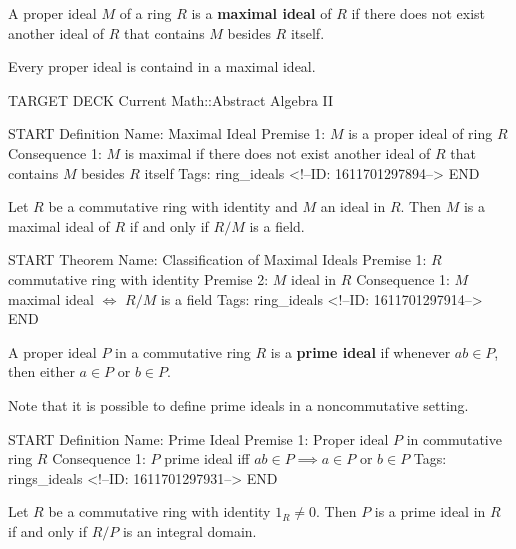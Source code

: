 \documentclass{memoir}
\begin{document}
\begin{defn}
	A proper ideal \(M\) of a ring \(R\) is a \textbf{maximal ideal} of \(R\) if there does not exist another ideal of \(R\) that contains \(M\) besides \(R\) itself.
\end{defn}
Every proper ideal is containd in a maximal ideal.

\begin{anki}
TARGET DECK
Current Math::Abstract Algebra II

START
Definition
Name: Maximal Ideal
Premise 1: \(M\) is a proper ideal of ring \(R\)
Consequence 1: \(M\) is maximal if there does not exist another ideal of \(R\) that contains \(M\) besides \(R\) itself
Tags: ring_ideals
<!--ID: 1611701297894-->
END
\end{anki}

\begin{thm}
	Let \(R\) be a commutative ring with identity and \(M\) an ideal in \(R\). Then \(M\) is a maximal ideal of \(R\) if and only if \(R / M\) is a field.
\end{thm}

\begin{anki}
START
Theorem
Name: Classification of Maximal Ideals
Premise 1: \(R\) commutative ring with identity
Premise 2: \(M\) ideal in \(R\)
Consequence 1: \(M\) maximal ideal \(\iff\) \(R/M\) is a field
Tags: ring_ideals
<!--ID: 1611701297914-->
END
\end{anki}

\begin{defn}
	A proper ideal \(P\) in a commutative ring \(R\) is a \textbf{prime ideal} if whenever \(ab \in P\), then either \(a \in P\) or \(b \in P\).
\end{defn}
Note that it is possible to define prime ideals in a noncommutative setting.

\begin{anki}
START
Definition
Name: Prime Ideal
Premise 1: Proper ideal \(P\) in commutative ring \(R\)
Consequence 1: \(P\) prime ideal iff \(ab \in P \implies a \in P\) or \(b \in P\)
Tags: rings_ideals
<!--ID: 1611701297931-->
END
\end{anki}

\begin{prop}
	Let \(R\) be a commutative ring with identity \(1_R\neq 0\). Then \(P\) is a prime ideal in \(R\) if and only if \(R / P\) is an integral domain.
\end{prop}
\end{document}

